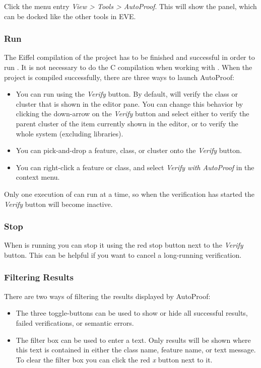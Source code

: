     Click the menu entry \emph{View > Tools > AutoProof}. This will show the \AutoProof panel, which can be docked like the other tools in EVE.

\subsubsection{Run \AutoProof}

    The Eiffel compilation of the project has to be finished and successful in order to run \AutoProof. It is not necessary to do the C compilation when working with \AutoProof. When the project is compiled successfully, there are three ways to launch AutoProof:

  \begin{itemize}
    \item You can run \AutoProof using the \emph{Verify} button. By default, \AutoProof will verify the class or cluster that is shown in the editor pane. You can change this behavior by clicking the down-arrow on the \emph{Verify} button and select either to verify the parent cluster of the item currently shown in the editor, or to verify the whole system (excluding libraries).
    \item You can pick-and-drop a feature, class, or cluster onto the \emph{Verify} button.
    \item You can right-click a feature or class, and select \emph{Verify with AutoProof} in the context menu.
  \end{itemize}

    Only one execution of \AutoProof can run at a time, so when the verification has started the \emph{Verify} button will become inactive.

\subsubsection{Stop \AutoProof}

    When \AutoProof is running you can stop it using the red stop button next to the \emph{Verify} button. This can be helpful if you want to cancel a long-running verification.

\subsubsection{Filtering Results}

    There are two ways of filtering the results displayed by AutoProof:

  \begin{itemize}
    \item The three toggle-buttons can be used to show or hide all successful results, failed verifications, or semantic errors.
    \item The filter box can be used to enter a text. Only results will be shown where this text is contained in either the class name, feature name, or text message. To clear the filter box you can click the red \emph{x} button next to it.
  \end{itemize}

